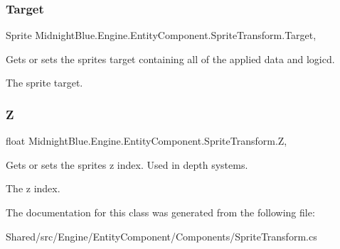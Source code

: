 \subsubsection{\texorpdfstring{Target}{Target}}
{\footnotesize\ttfamily Sprite Midnight\+Blue.\+Engine.\+Entity\+Component.\+Sprite\+Transform.\+Target\hspace{0.3cm}{\ttfamily [get]}, {\ttfamily [set]}}



Gets or sets the sprites target containing all of the applied data and logicd. 

The sprite target.\hypertarget{class_midnight_blue_1_1_engine_1_1_entity_component_1_1_sprite_transform_aa26777c6bccabaf04ea51453feabab6e}{}\label{class_midnight_blue_1_1_engine_1_1_entity_component_1_1_sprite_transform_aa26777c6bccabaf04ea51453feabab6e} 
\subsubsection{\texorpdfstring{Z}{Z}}
{\footnotesize\ttfamily float Midnight\+Blue.\+Engine.\+Entity\+Component.\+Sprite\+Transform.\+Z\hspace{0.3cm}{\ttfamily [get]}, {\ttfamily [set]}}



Gets or sets the sprites z index. Used in depth systems. 

The z index.

The documentation for this class was generated from the following file\+:\begin{DoxyCompactItemize}
\item 
Shared/src/\+Engine/\+Entity\+Component/\+Components/Sprite\+Transform.\+cs\end{DoxyCompactItemize}
